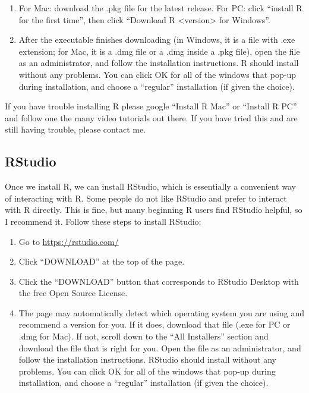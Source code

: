 \documentclass[
]{krantz}
\begin{document}
\begin{enumerate}
\def\labelenumi{\arabic{enumi}.}
\setcounter{enumi}{2}
\item
  For Mac: download the .pkg file for the latest release. For PC: click ``install R for the first time'', then click ``Download R \textless version\textgreater{} for Windows''.
\item
  After the executable finishes downloading (in Windows, it is a file with .exe extension; for Mac, it is a .dmg file or a .dmg inside a .pkg file), open the file as an administrator, and follow the installation instructions. R should install without any problems. You can click OK for all of the windows that pop-up during installation, and choose a ``regular'' installation (if given the choice).
\end{enumerate}

If you have trouble installing R please google ``Install R Mac'' or ``Install R PC'' and follow one the many video tutorials out there. If you have tried this and are still having trouble, please contact me.

\hypertarget{rstudio}{%
\subsection{RStudio}\label{rstudio}}

Once we install R, we can install RStudio, which is essentially a convenient way of interacting with R. Some people do not like RStudio and prefer to interact with R directly. This is fine, but many beginning R users find RStudio helpful, so I recommend it. Follow these steps to install RStudio:

\begin{enumerate}
\def\labelenumi{\arabic{enumi}.}
\item
  Go to \url{https://rstudio.com/}
\item
  Click ``DOWNLOAD'' at the top of the page.
\item
  Click the ``DOWNLOAD'' button that corresponds to RStudio Desktop with the free Open Source License.
\item
  The page may automatically detect which operating system you are using and recommend a version for you. If it does, download that file (.exe for PC or .dmg for Mac). If not, scroll down to the ``All Installers'' section and download the file that is right for you. Open the file as an administrator, and follow the installation instructions. RStudio should install without any problems. You can click OK for all of the windows that pop-up during installation, and choose a ``regular'' installation (if given the choice).
\end{enumerate}
\end{document}
